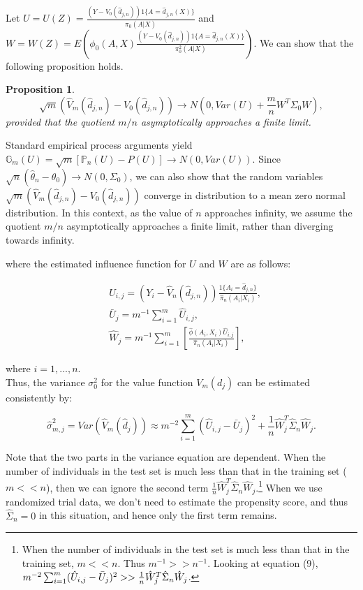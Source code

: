 \documentclass{article}
\newtheorem{proposition}{Proposition}
\begin{document}
Let $U=U(Z)=\frac{(Y-V_0(\hat{d}_{j,n}))1\{A=\hat{d}_{j,n}(X)\}}{\pi_0(A|X)}$ and $W = W(Z) = E(\phi_0(A,X)\frac{(Y-V_0(\hat{d}_{j,n}))1\{A=\hat{d}_{j,n}(X)\}}{\pi^2_0(A|X)})$. We can show that the following proposition holds.\\

\begin{proposition} \label{prop:vvar}
\begin{equation}
    \sqrt{m}(\hat{V}_{m}(\hat{d}_{j,n})-V_0(\hat{d}_{j,n})) \rightarrow N(0,Var(U)+\frac{m}{n} W^T \Sigma_0 W),
\end{equation}
provided that the quotient $m/n$ asymptotically approaches a finite limit.
\end{proposition}


Standard empirical process arguments yield $\mathbb{G}_{m}(U) = \sqrt{m}[\mathbb{P}_{n}(U)-P(U)] \rightarrow N(0,Var(U))$. Since $\sqrt{n}(\hat{\theta}_n-\theta_0) \rightarrow N(0,\Sigma_0)$, we can also show that the random variables $\sqrt{m}(\hat{V}_{m}(\hat{d}_{j,n})-V_0(\hat{d}_{j,n}))$ converge in distribution to a mean zero normal distribution. In this context, as the value of $n$ approaches infinity, we assume the quotient $m/n$ asymptotically approaches a finite limit, rather than diverging towards infinity. 

where the estimated influence function for $U$ and $W$ are as follows:

\begin{align}
 &\hat{U}_{i,j}  =(Y_{i}-\hat{V}_{n}(\hat{d}_{j,n}))\frac{1\{A_{i}=\hat{d}_{j,n}\}}{\hat{\pi}_{n}(A_i|X_i)},\\
 &\bar{U}_{j} = m^{-1}\sum_{i=1}^{m}\hat{U}_{i,j},\\
 &\hat{W}_{j}  = m^{-1}\sum_{i=1}^{m}[\frac{\hat{\phi}(A_i,X_i)\hat{U}_{i,j}}{\hat{\pi}_{n}(A_i|X_i)}], 
\end{align}

where $i = 1,...,n$.\\

Thus, the variance $\sigma_0^2$ for the value function $V_m(d_j)$ can be estimated consistently by:

\begin{equation}\label{eq:estvar}
\hat{\sigma}^2_{m,j}=Var(\hat{V}_{m}(\hat{d}_{j})) \approx m^{-2}\sum_{i=1}^{m}(\hat{U}_{i,j}-\bar{U}_{j})^2+\frac{1}{n}\hat{W}_{j}^T\hat{\Sigma}_{n}\hat{W}_{j}.
\end{equation}

Note that the two parts in the variance equation are dependent. When the number of individuals in the test set is much less than that in the training set ($m<<n$), then we can ignore the second term $\frac{1}{n}\hat{W}_{j}^T\hat{\Sigma}_{n}\hat{W}_{j}$.\footnote{When the number of individuals in the test set is much less than that in the training set, $m<<n$. Thus $m^{-1}>>n^{-1}$. Looking at equation (9),
$m^{-2}\sum_{i=1}^{m}(\hat{U}_{i,j}-\Bar{U}_{j})^2 >> \frac{1}{n}\hat{W}_{j}^T\hat{\Sigma}_{n}\hat{W}_{j}$.
} When we use randomized trial data, we don't need to estimate the propensity score, and thus $\hat{\Sigma}_n=0$ in this situation, and hence only the first term remains.
\end{document}
